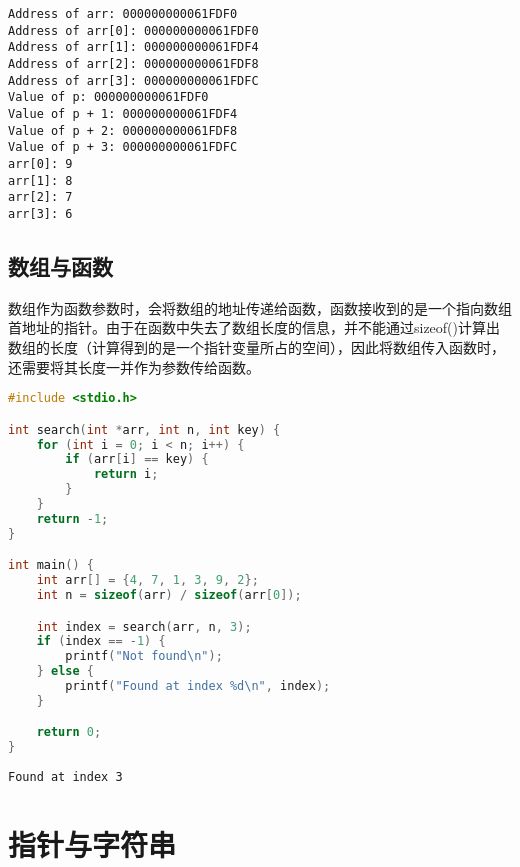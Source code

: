\begin{tcolorbox}
    \begin{verbatim}
Address of arr: 000000000061FDF0
Address of arr[0]: 000000000061FDF0
Address of arr[1]: 000000000061FDF4
Address of arr[2]: 000000000061FDF8
Address of arr[3]: 000000000061FDFC
Value of p: 000000000061FDF0
Value of p + 1: 000000000061FDF4
Value of p + 2: 000000000061FDF8
Value of p + 3: 000000000061FDFC
arr[0]: 9
arr[1]: 8
arr[2]: 7
arr[3]: 6
	\end{verbatim}
\end{tcolorbox}

\vspace{0.5cm}

\subsection{数组与函数}

数组作为函数参数时，会将数组的地址传递给函数，函数接收到的是一个指向数组首地址的指针。由于在函数中失去了数组长度的信息，并不能通过sizeof()计算出数组的长度（计算得到的是一个指针变量所占的空间），因此将数组传入函数时，还需要将其长度一并作为参数传给函数。\\


\begin{lstlisting}[language=C]
#include <stdio.h>

int search(int *arr, int n, int key) {
    for (int i = 0; i < n; i++) {
        if (arr[i] == key) {
            return i;
        }
    }
    return -1;
}

int main() {
    int arr[] = {4, 7, 1, 3, 9, 2};
    int n = sizeof(arr) / sizeof(arr[0]);

    int index = search(arr, n, 3);
    if (index == -1) {
        printf("Not found\n");
    } else {
        printf("Found at index %d\n", index);
    }

    return 0;
}
\end{lstlisting}

\begin{tcolorbox}
    \begin{verbatim}
Found at index 3
	\end{verbatim}
\end{tcolorbox}

\newpage

\section{指针与字符串}

